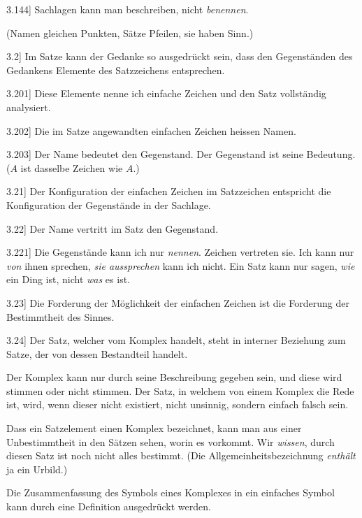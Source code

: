 \documentclass[12pt,oneside]{book}[2007/10/19]
\newcommand{\PropERef}[1]{\hyperref[PropE:#1]{#1}}
\newcommand{\PropositionG}[2]{%
  \item[\phantomsection\label{PropG:#1}\PropERef{#1}] #2%
}
\newcommand{\Emph}[1]{\emph{#1}}%
\begin{document}
\begin{propositions}
\PropositionG{3.144}
{Sachlagen kann man beschreiben, nicht \Emph{benennen}.

(Namen gleichen Punkten, Sätze Pfeilen, sie
haben Sinn.)}


\PropositionG{3.2}
{Im Satze kann der Gedanke so ausgedrückt sein,
dass den Gegenständen des Gedankens Elemente
des Satzzeichens entsprechen.}


\PropositionG{3.201}
{Diese Elemente nenne ich \glqq{}einfache Zeichen\grqq{}
und den Satz \glqq{}vollständig analysiert\grqq{}.}


\PropositionG{3.202}
{Die im Satze angewandten einfachen Zeichen
heissen Namen.}


\PropositionG{3.203}
{Der Name bedeutet den Gegenstand. Der
Gegenstand ist seine Bedeutung. (\glqq{}$A$\grqq{} ist dasselbe
Zeichen wie \glqq{}$A$\grqq{}.)}


\PropositionG{3.21}
{Der Konfiguration der einfachen Zeichen im
Satzzeichen entspricht die Konfiguration der Gegenstände
in der Sachlage.}


\PropositionG{3.22}
{Der Name vertritt im Satz den Gegenstand.}


\PropositionG{3.221}
{Die Gegenstände kann ich nur \Emph{nennen}. Zeichen
vertreten sie. Ich kann nur \Emph{von} ihnen sprechen,
\Emph{sie aussprechen} kann ich nicht. Ein Satz
kann nur sagen, \Emph{wie} ein Ding ist, nicht \Emph{was} es ist.}


\PropositionG{3.23}
{Die Forderung der Möglichkeit der einfachen
Zeichen ist die Forderung der Bestimmtheit des
Sinnes.}


\PropositionG{3.24}
{Der Satz, welcher vom Komplex handelt, steht
in interner Beziehung zum Satze, der von dessen
Bestandteil handelt.

Der Komplex kann nur durch seine Beschreibung
gegeben sein, und diese wird stimmen oder
nicht stimmen. Der Satz, in welchem von einem
Komplex die Rede ist, wird, wenn dieser nicht
existiert, nicht unsinnig, sondern einfach falsch sein.

Dass ein Satzelement einen Komplex bezeichnet,
kann man aus einer Unbestimmtheit in den Sätzen
sehen, worin es vorkommt. Wir \Emph{wissen}, durch
diesen Satz ist noch nicht alles bestimmt. (Die
Allgemeinheitsbezeichnung \Emph{enthält} ja ein Urbild.)

Die Zusammenfassung des Symbols eines Komplexes
in ein einfaches Symbol kann durch eine
\enlargethispage{4pt} %
Definition ausgedrückt werden.}



\end{propositions}
\end{document}

